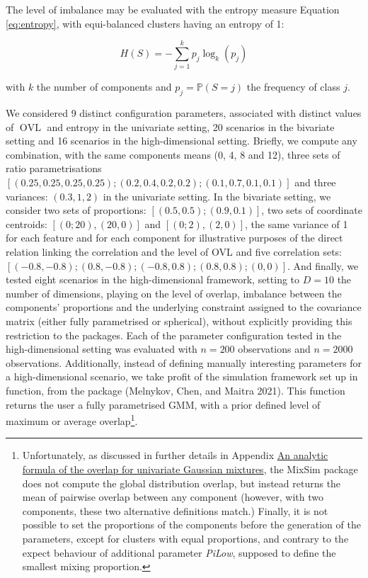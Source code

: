 The level of imbalance may be evaluated with the entropy measure Equation \eqref{eq:entropy}, with equi-balanced clusters having an entropy of 1:

\begin{equation}
    H(S)=-\sum_{j=1}^k p_j \log_k (p_j)
\label{eq:entropy}
\end{equation}

with \(k\) the number of components and \(p_j=\mathbb{P}(S=j)\) the frequency of class \(j\).

We considered 9 distinct configuration parameters, associated with distinct values of \(\operatorname{OVL}\) and entropy in the univariate setting, 20 scenarios in the bivariate setting and 16 scenarios in the high-dimensional setting. Briefly, we compute any combination, with the same components means (0, 4, 8 and 12), three sets of ratio parametrisations \(\left[(0.25, 0.25, 0.25, 0.25); (0.2, 0.4, 0.2, 0.2); (0.1, 0.7, 0.1, 0.1) \right]\) and three variances: \((0.3, 1, 2)\) in the univariate setting. In the bivariate setting, we consider two sets of proportions: \(\left[(0.5, 0.5); (0.9, 0.1) \right]\), two sets of coordinate centroids: \(\left[(0; 20), (20, 0) \right]\) and \(\left[(0; 2), (2, 0) \right]\), the same variance of 1 for each feature and for each component for illustrative purposes of the direct relation linking the correlation and the level of OVL and five correlation sets: \(\left[(-0.8, -0.8); (0.8, -0.8); (-0.8, 0.8); (0.8, 0.8); (0, 0)\right]\).
\color{blue}And finally, we tested eight scenarios in the high-dimensional framework, setting to \(D=10\) the number of dimensions, playing on the level of overlap, imbalance between the components' proportions and the underlying constraint assigned to the covariance matrix (either fully parametrised or spherical), without explicitly providing this restriction to the packages. Each of the parameter configuration tested in the high-dimensional setting was evaluated with \(n=200\) observations and \(n=2000\) observations. Additionally, instead of defining manually interesting parameters for a high-dimensional scenario, we take profit of the simulation framework set up in  function, from the  package (Melnykov, Chen, and Maitra 2021). This function returns the user a fully parametrised GMM, with a prior defined level of maximum or average overlap\footnote{Unfortunately, as discussed in further details in Appendix \protect\hyperlink{an-analytic-formula-of-the-overlap-for-univariate-gaussian-mixtures}{An analytic formula of the overlap for univariate Gaussian mixtures}, the MixSim package does not compute the global distribution overlap, but instead returns the mean of pairwise overlap between any component (however, with two components, these two alternative definitions match.) Finally, it is not possible to set the proportions of the components before the generation of the parameters, except for clusters with equal proportions, and contrary to the expect behaviour of additional parameter \emph{PiLow}, supposed to define the smallest mixing proportion.}.
\color{black}

